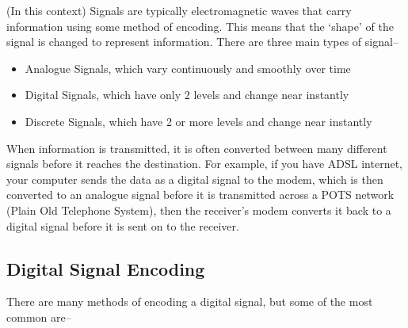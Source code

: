 (In this context) Signals are typically electromagnetic waves that carry information using some method of encoding.
 This means that the `shape' of the signal is changed to represent information. There are three main types of signal--

\begin{itemize}
  \item Analogue Signals, which vary continuously and smoothly over time
  \item Digital Signals, which have only 2 levels and change near instantly
  \item Discrete Signals, which have 2 or more levels and change near instantly
\end{itemize}

When information is transmitted, it is often converted between many different signals before it reaches the destination.
 For example, if you have ADSL internet, your computer sends the data as a digital signal to the modem, which is then
 converted to an analogue signal before it is transmitted across a POTS network (Plain Old Telephone System), then the
 receiver's modem converts it back to a digital signal before it is sent on to the receiver.

\subsection*{Digital Signal Encoding}

There are many methods of encoding a digital signal, but some of the most common are--

